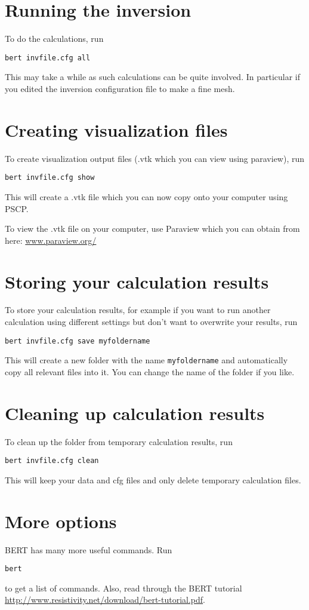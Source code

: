 \documentclass[11pt]{article}
\begin{document}
\section{Running the inversion}

To do the calculations, run

\quad \verb#bert invfile.cfg all#

This may take a while as such calculations can be quite involved. In
particular if you edited the inversion configuration file to make a
fine mesh.

\section{Creating visualization files}
To create visualization output files (.vtk which you can view using
paraview), run

\quad \verb#bert invfile.cfg show#

This will create a .vtk file which you can now copy onto your computer
using PSCP.

To view the .vtk file on your computer, use Paraview which you can
obtain from here: \url{www.paraview.org/}

\section{Storing your calculation results}
To store your calculation results, for example if you want to run
another calculation using different settings but don't want to
overwrite your results, run

\quad \verb#bert invfile.cfg save myfoldername#

This will create a new folder with the name \verb#myfoldername# and
automatically copy all relevant files into it. You can change the name
of the folder if you like.

\section{Cleaning up calculation results}

To clean up the folder from temporary calculation results, run

\quad \verb#bert invfile.cfg clean#

This will keep your data and cfg files and only delete temporary
calculation files.

\section{More options}

BERT has many more useful commands. Run

\qquad \verb+bert+

to get a list of commands. Also, read through the BERT tutorial\\
\url{http://www.resistivity.net/download/bert-tutorial.pdf}.
\end{document}
